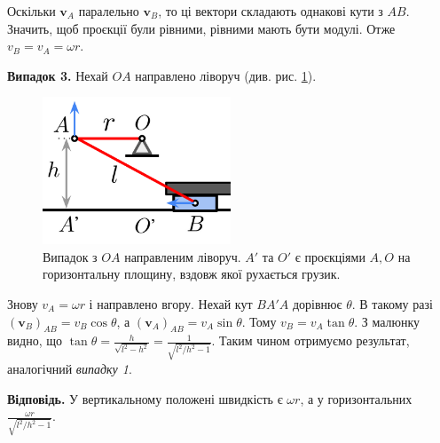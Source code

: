 \documentclass[12pt]{extarticle}
\begin{document}
Оскільки $\boldsymbol{v}_A$ паралельно $\boldsymbol{v}_B$, то ці вектори складають однакові кути з $AB$. Значить, щоб проєкції були рівними, рівними мають бути модулі. Отже $v_B=v_A=\omega r$.

\textbf{Випадок 3.} Нехай $OA$ направлено ліворуч (див. рис. \ref{fig:3}).

\begin{figure}[H]
    \centering
    \includegraphics[width=0.5\textwidth]{images/hw_3/hw_3_3.png}
    \caption{Випадок з $OA$ направленим ліворуч. $A'$ та $O'$ є проєкціями $A,O$ на горизонтальну площину, вздовж якої рухається грузик.}
    \label{fig:3}
\end{figure}
\vspace{5px}

Знову $v_A=\omega r$ і направлено вгору. Нехай кут $BA'A$ дорівнює $\theta$. В такому разі $(\boldsymbol{v}_B)_{AB} = v_B \cos \theta$, а $(\boldsymbol{v}_A)_{AB} = v_A \sin \theta$. Тому $v_B = v_A \tan \theta$. З малюнку видно, що $\tan\theta = \frac{h}{\sqrt{l^2-h^2}} = \frac{1}{\sqrt{l^2/h^2-1}}$. Таким чином отримуємо результат, аналогічний \textit{випадку 1}.

\textbf{Відповідь.} У вертикальному положені швидкість є $\omega r$, а у горизонтальних $\frac{\omega r}{\sqrt{l^2/h^2-1}}$.
\end{document}
